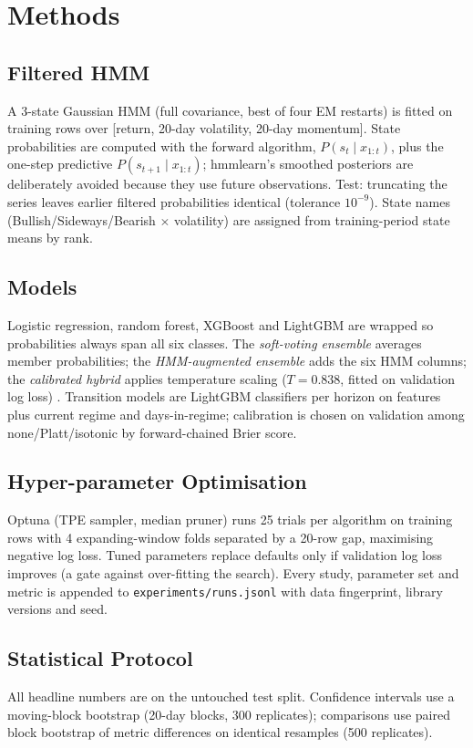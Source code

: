 \documentclass[conference]{IEEEtran}
\begin{document}
\section{Methods}
\subsection{Filtered HMM}
A 3-state Gaussian HMM (full covariance, best of four EM restarts) is fitted on training rows over [return, 20-day volatility, 20-day momentum]. State probabilities are computed with the forward algorithm, $P(s_t\mid x_{1:t})$, plus the one-step predictive $P(s_{t+1}\mid x_{1:t})$; hmmlearn's smoothed posteriors are deliberately avoided because they use future observations. Test: truncating the series leaves earlier filtered probabilities identical (tolerance $10^{-9}$). State names (Bullish/Sideways/Bearish $\times$ volatility) are assigned from training-period state means by rank.

\subsection{Models}
Logistic regression, random forest, XGBoost and LightGBM are wrapped so probabilities always span all six classes. The \emph{soft-voting ensemble} averages member probabilities; the \emph{HMM-augmented ensemble} adds the six HMM columns; the \emph{calibrated hybrid} applies temperature scaling ($T=0.838$, fitted on validation log loss) \cite{guo17}. Transition models are LightGBM classifiers per horizon on features plus current regime and days-in-regime; calibration is chosen on validation among none/Platt/isotonic by forward-chained Brier score.

\subsection{Hyper-parameter Optimisation}
Optuna (TPE sampler, median pruner) \cite{akiba19} runs 25 trials per algorithm on training rows with 4 expanding-window folds separated by a 20-row gap, maximising negative log loss. Tuned parameters replace defaults only if validation log loss improves (a gate against over-fitting the search). Every study, parameter set and metric is appended to \texttt{experiments/runs.jsonl} with data fingerprint, library versions and seed.

\subsection{Statistical Protocol}
All headline numbers are on the untouched test split. Confidence intervals use a moving-block bootstrap (20-day blocks, 300 replicates); comparisons use paired block bootstrap of metric differences on identical resamples (500 replicates).
\end{document}
